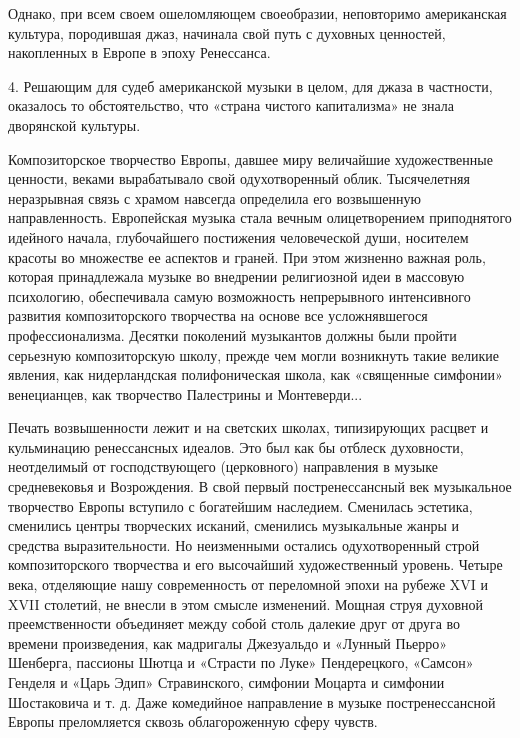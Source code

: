 Однако,   при  всем   своем   ошеломляющем  своеобразии,   неповторимо
американская культура, породившая джаз,  начинала свой путь с духовных
ценностей, накопленных в Европе в эпоху Ренессанса.

4.  Решающим  для  судеб  американской   музыки  в  целом,  для  джаза
в  частности,   оказалось  то  обстоятельство,  что   «страна  чистого
капитализма» не знала дворянской культуры.

Композиторское    творчество    Европы,   давшее    миру    величайшие
художественные  ценности,  веками   вырабатывало  свой  одухотворенный
облик.  Тысячелетняя неразрывная  связь с  храмом навсегда  определила
его  возвышенную  направленность.   Европейская  музыка  стала  вечным
олицетворением приподнятого  идейного начала,  глубочайшего постижения
человеческой  души,  носителем  красоты  во множестве  ее  аспектов  и
граней.  При этом  жизненно важная  роль, которая  принадлежала музыке
во  внедрении религиозной  идеи  в  массовую психологию,  обеспечивала
самую возможность  непрерывного интенсивного  развития композиторского
творчества  на  основе  все усложнявшегося  профессионализма.  Десятки
поколений  музыкантов  должны  были  пройти  серьезную  композиторскую
школу,  прежде  чем  могли   возникнуть  такие  великие  явления,  как
нидерландская   полифоническая   школа,   как   «священные   симфонии»
венецианцев, как творчество Палестрины и Монтеверди...

Печать возвышенности лежит и  на светских школах, типизирующих расцвет
и кульминацию ренессансных идеалов. Это был как бы отблеск духовности,
неотделимый  от  господствующего  (церковного)  направления  в  музыке
средневековья  и  Возрождения.  В  свой  первый  постренессансный  век
музыкальное  творчество   Европы  вступило  с   богатейшим  наследием.
Сменилась  эстетика, сменились  центры  творческих исканий,  сменились
музыкальные жанры и средства  выразительности. Но неизменными остались
одухотворенный  строй  композиторского  творчества  и  его  высочайший
художественный уровень. Четыре века,  отделяющие нашу современность от
переломной  эпохи на  рубеже XVI  и XVII  столетий, не  внесли в  этом
смысле  изменений. Мощная  струя  духовной преемственности  объединяет
между собой столь  далекие друг от друга во  времени произведения, как
мадригалы  Джезуальдо и  «Лунный  Пьерро» Шенберга,  пассионы Шютца  и
«Страсти  по  Луке»  Пендерецкого,  «Самсон»  Генделя  и  «Царь  Эдип»
Стравинского, симфонии  Моцарта и  симфонии Шостаковича  и т.  д. Даже
комедийное направление  в музыке постренессансной  Европы преломляется
сквозь облагороженную сферу чувств.

